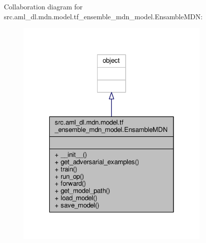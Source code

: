 Collaboration diagram for src.\-aml\-\_\-dl.\-mdn.\-model.\-tf\-\_\-ensemble\-\_\-mdn\-\_\-model.\-Ensamble\-M\-D\-N\-:
\nopagebreak
\begin{figure}[H]
\begin{center}
\leavevmode
\includegraphics[width=268pt]{classsrc_1_1aml__dl_1_1mdn_1_1model_1_1tf__ensemble__mdn__model_1_1_ensamble_m_d_n__coll__graph}
\end{center}
\end{figure}
